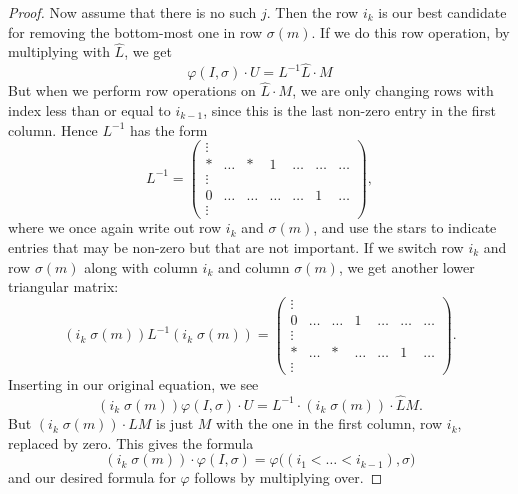 \begin{proof}
  Now assume that there is no such $j$. Then the row $i_k$ is our best
  candidate for removing the bottom-most one in row $\sigma(m)$. If we
  do this row operation, by multiplying with $\widehat L$, we get
  \[ \varphi(I,\sigma)\cdot U = L^{-1}\widehat{L} \cdot M \]
  But when we perform row operations on $\widehat{L} \cdot M$, we are
  only changing rows with index less than or equal to $i_{k-1}$, since
  this is the last non-zero entry in the first column. Hence $L^{-1}$
  has the form
  \[ L^{-1} = 
  \begin{pmatrix}
    \vdots \\
    * & \dots & * & 1 & \dots & \dots & \dots \\
    \vdots \\
    0 & \dots & \dots & \dots & \dots & 1 & \dots \\
    \vdots
  \end{pmatrix},
  \]
  where we once again write out row $i_k$ and $\sigma(m)$, and use the
  stars to indicate entries that may be non-zero but that are not
  important.
  If we switch row $i_k$ and row $\sigma(m)$ along with column
  $i_k$ and column $\sigma(m)$, we get another lower triangular
  matrix:
  \[ (i_k \; \sigma(m)) L^{-1} (i_k \; \sigma(m)) = 
  \begin{pmatrix}
    \vdots \\
    0 & \dots & \dots & 1 & \dots & \dots & \dots \\
    \vdots \\
    * & \dots & * & \dots & \dots & 1 & \dots \\
    \vdots
  \end{pmatrix}.\]
  Inserting in our original equation, we see
  \[ (i_k \; \sigma(m)) \varphi(I,\sigma) \cdot U = L^{-1} \cdot (i_k \;
  \sigma(m)) \cdot \widehat{L} M. \]
  But $(i_k \; \sigma(m)) \cdot \widehat{L} M$ is just $M$ with the
  one in the first column, row $i_k$, replaced by zero. This gives the
  formula
  \[ (i_k \; \sigma(m)) \cdot \varphi(I,\sigma) =
  \varphi\big((i_1<\dots<i_{k-1}),\sigma\big) \]
  and our desired formula for $\varphi$ follows by multiplying over.
\end{proof}


